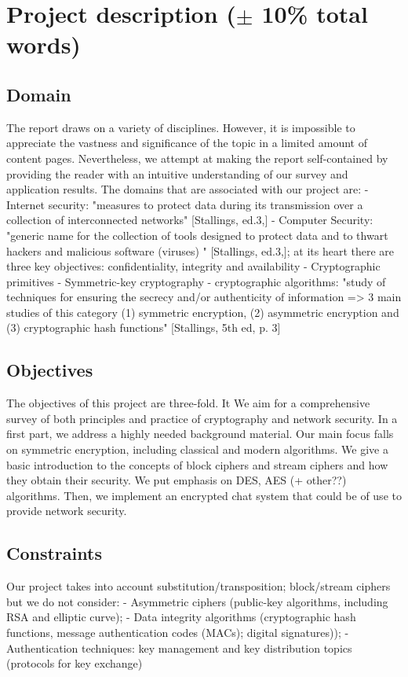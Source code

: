 \section{Project description ($\pm$ 10\% total words) }
\subsection{Domain}
The report draws on a variety of disciplines. However, it is impossible to appreciate the vastness and significance of the topic in a limited amount of content pages. Nevertheless, we attempt at making the report self-contained by providing the reader with an intuitive understanding of our survey and application results.
The domains that are associated with our project are: 
-	Internet security: "measures to protect data during its transmission over a collection of interconnected networks" [Stallings, ed.3,]
-	Computer Security: "generic name for the collection of tools designed to protect data and to thwart hackers and malicious software (viruses) " [Stallings, ed.3,]; at its heart there are three key objectives: confidentiality, integrity and availability
-	Cryptographic primitives
-	Symmetric-key cryptography
-	cryptographic algorithms: "study of techniques for ensuring the secrecy and/or authenticity of information => 3 main studies of this category (1) symmetric encryption, (2) asymmetric encryption and (3) cryptographic hash functions" [Stallings, 5th ed, p. 3]



\subsection{Objectives}
The objectives of this project are three-fold. It We aim for a comprehensive survey of both principles and practice of cryptography and network security. In a first part, we address a highly needed background material.  Our main focus falls on symmetric encryption, including classical and modern algorithms. We give a basic introduction to the concepts of block ciphers and stream ciphers and how they obtain their security. We put emphasis on DES, AES (+ other??) algorithms. Then, we implement an encrypted chat system that could be of use to provide network security.
\subsection{Constraints}
Our project takes into account substitution/transposition; block/stream ciphers but we do not consider:
-	Asymmetric ciphers (public-key algorithms, including RSA and elliptic curve); 
-	Data integrity algorithms (cryptographic hash functions, message authentication codes (MACs); digital signatures)); 
-	Authentication techniques: key management and key distribution topics (protocols for key exchange)

